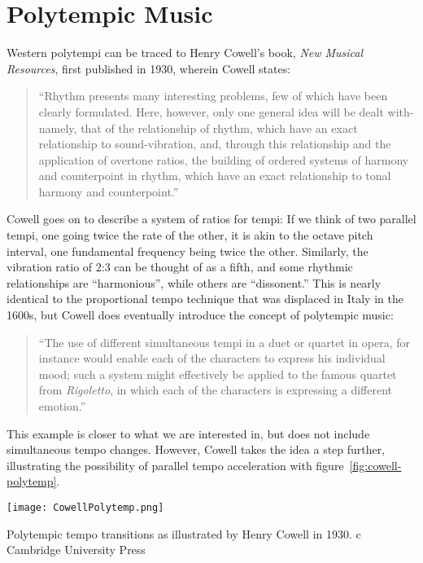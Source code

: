 \section{Polytempic Music}
\label{sec:background-polytempi}
Western polytempi can be traced to Henry Cowell's book, \textit{New Musical
  Resources}, first published in 1930, wherein Cowell states:
\begin{quotation}
  ``Rhythm presents many interesting problems, few of which have been
  clearly formulated. Here, however, only one general idea will be
  dealt with-namely, that of the relationship of rhythm, which have an
  exact relationship to sound-vibration, and, through this
  relationship and the application of overtone ratios, the building of
  ordered systems of harmony and counterpoint in rhythm, which have an
  exact relationship to tonal harmony and
  counterpoint.''\cite{Cowell1996}
\end{quotation}
Cowell goes on to describe a system of ratios for tempi: If we think
of two parallel tempi, one going twice the rate of the other, it is
akin to the octave pitch interval, one fundamental frequency being
twice the other. Similarly, the vibration ratio of 2:3 can be thought
of as a fifth, and some rhythmic relationships are ``harmonious'',
while others are ``dissonent.'' This is nearly identical to the
proportional tempo technique that was displaced in Italy in the 1600s,
but Cowell does eventually introduce the concept of polytempic music:
\begin{quotation}
``The use of different simultaneous tempi in a duet or quartet in opera,
for instance would enable each of the characters  to express his
individual mood; such a system might  effectively be applied to the
famous quartet from \textit{Rigoletto}, in which each of the
characters is expressing a different emotion.''
\end{quotation}
This example is closer to what we are interested in, but does not
include simultaneous tempo changes. However, Cowell takes the
idea a step further, illustrating the possibility of parallel tempo
acceleration with figure~\ref{fig:cowell-polytemp}.
\begin{marginfigure}
  \texttt{[image: CowellPolytemp.png]}
  \caption{Polytempic tempo transitions as illustrated by Henry Cowell
    in 1930. \textcircled{c} Cambridge University Press}
  \label{fig:cowell-polytemp}
\end{marginfigure}
